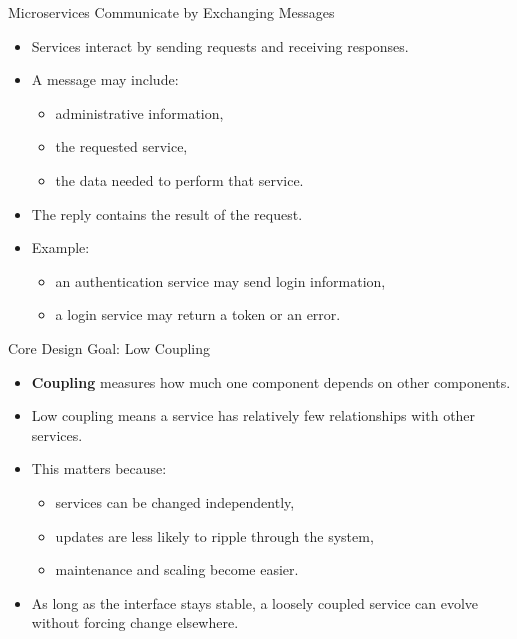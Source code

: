 \begin{frame}{Microservices Communicate by Exchanging Messages}
\begin{itemize}
    \item Services interact by sending requests and receiving responses.
    \item A message may include:
    \begin{itemize}
        \item administrative information,
        \item the requested service,
        \item the data needed to perform that service.
    \end{itemize}
    \item The reply contains the result of the request.
    \item Example:
    \begin{itemize}
        \item an authentication service may send login information,
        \item a login service may return a token or an error.
    \end{itemize}
\end{itemize}
\end{frame}

\begin{frame}{Core Design Goal: Low Coupling}
\begin{itemize}
    \item \textbf{Coupling} measures how much one component depends on other components.
    \item Low coupling means a service has relatively few relationships with other services.
    \item This matters because:
    \begin{itemize}
        \item services can be changed independently,
        \item updates are less likely to ripple through the system,
        \item maintenance and scaling become easier.
    \end{itemize}
    \item As long as the interface stays stable, a loosely coupled service can evolve without forcing change elsewhere.
\end{itemize}
\end{frame}

